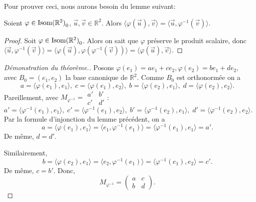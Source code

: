 \documentclass{book}
\numberwithin{equation}{section}
\renewcommand{\phi}{\varphi}
\providecommand{\plan}{{\mathbb R^2}}
\providecommand{\isom}{{\textnormal{Isom}(\plan)}}
\providecommand{\isomo}{{\isom_0}}
\providecommand{\scalaire}[1]{{\langle#1\rangle}}
\begin{document}
Pour prouver ceci, nous aurons besoin du lemme suivant:

\begin{lemme}
	Soient $\phi \in \isomo$, $\vec u, \vec v \in \plan$. Alors $\scalaire{\phi(\vec u), \vec v} = \scalaire{\vec u, \phi^{-1}(\vec v)}$.
\end{lemme}

\begin{proof}
	Soit $\phi \in \isomo$. Alors on sait que $\phi$ préserve le produit scalaire, donc $\scalaire{\vec u, \phi^{-1}(\vec v)} = \scalaire{\phi(\vec u), \phi(\phi^{-1}(\vec v))} = \scalaire{\phi(\vec u), \vec v}$.
\end{proof}

\begin{proof}[Démonstration du théorème.]
	Posons $\phi(e_1) = ae_1 + ce_2, \phi(e_2) = be_1 + de_2$, avec $B_0 = (e_1, e_2)$ la base canonique de $\plan$. Comme $B_0$ est orthonormée on a
	\begin{equation*}
		a = \scalaire{\phi(e_1), e_1}, \;
		c = \scalaire{\phi(e_1), e_2}, \;
		b = \scalaire{\phi(e_2), e_1}, \;
		d = \scalaire{\phi(e_2), e_2}.
	\end{equation*}
	Pareillement, avec $M_{\phi^{-1}} = \begin{smallmatrix} a'&b'\\c'&d' \end{smallmatrix}$:
	\begin{equation*}
		a' = \scalaire{\phi^{-1}(e_1), e_1}, \;
		c' = \scalaire{\phi^{-1}(e_1), e_2}, \;
		b' = \scalaire{\phi^{-1}(e_2), e_1}, \;
		d' = \scalaire{\phi^{-1}(e_2), e_2}.
	\end{equation*}
	Par la formule d'injonction du lemme précédent, on a
	\begin{equation*}
		a = \scalaire{\phi(e_1), e_1} = \scalaire{e_1, \phi^{-1}(e_1)} = \scalaire{\phi^{-1}(e_1), e_1} = a'.
	\end{equation*}
	De même, $d = d'$.\par
	Similairement,
	\begin{equation*}
		b = \scalaire{\phi(e_2), e_1} = \scalaire{e_2, \phi^{-1}(e_1)} = \scalaire{\phi^{-1}(e_1), e_2} = c'.
	\end{equation*}
	De même, $c = b'$. Donc,
	\begin{equation*}
		M_{\phi^{-1}} = \begin{pmatrix}
			a & c\\
			b & d
		\end{pmatrix}.
	\end{equation*}

\end{proof}
\end{document}
